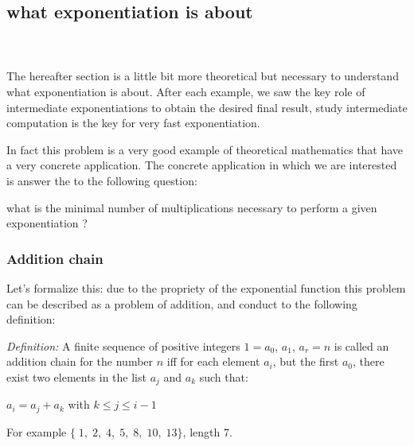 \newpage
\subsection{what exponentiation is about}
\label{RSA_what_exponentiation_is_about}

\cite{unibordeau-2006-bergson}\\
\cite{preprint-2006-bernstein}\\



The hereafter section is a little bit more theoretical	but
necessary to understand what exponentiation is about.
After each example, we saw the key role of intermediate exponentiations to obtain 
the desired final result, study intermediate computation is the key for very fast 
exponentiation.

In fact this problem is a very good example of theoretical mathematics that have 
a very concrete application. The concrete application in which we are interested
is answer the to the following question: 

what is the minimal number of multiplications 
necessary to perform a given exponentiation ?

\subsubsection*{Addition chain}	
		
Let's formalize this: due to the propriety of the exponential function this
problem can be described as a problem of addition, and conduct to the following definition:

\textit{Definition:}
	A finite sequence of positive integers $1=a_0$, $a_1$, $a_r=n$ is called an 
	addition chain for the number $n$ iff for each element $a_i$, but the first $a_0$, 
	there exist two elements in the list $a_j$ and $a_k$ such that:
	\begin{center}
	$a_i  = a_j+a_k$ with $k \leq j \leq i-1$
	\end{center}
	For example $\{\;1,\; 2,\; 4,\; 5,\; 8,\; 10,\; 13\}$, length 7.
	
